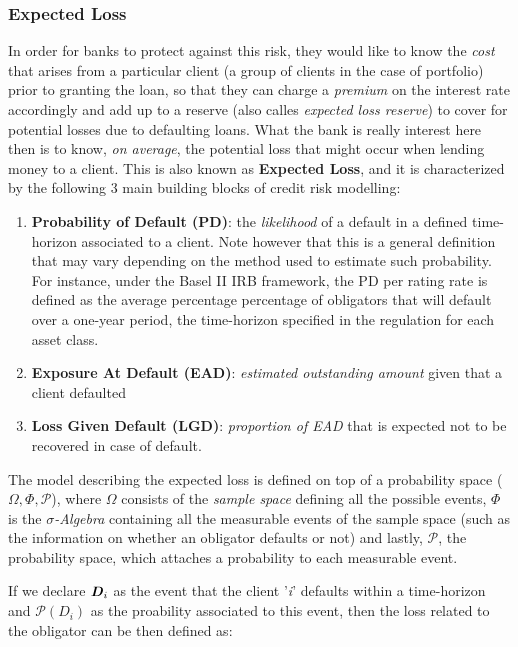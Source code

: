 \documentclass[a4paper,12pt]{article}
\begin{document}
    \subsubsection{Expected Loss}
    In order for banks to protect against this risk, they would like to know the \textit{cost} that arises from a particular client (a group of clients in the case of portfolio) 
    prior to granting the loan, so that they can charge a \textit{premium} on the interest rate accordingly and add up to a reserve (also calles \textit{expected loss reserve}) to cover for potential losses due to defaulting loans.
    What the bank is really interest here then is to know, \textit{on average}, the potential loss that might occur when lending money to a client. This is also known as \textbf{Expected Loss}, and it is characterized by the following 3 main building blocks of credit risk modelling:

        \begin{enumerate}
            \item \textbf{Probability of Default (PD)}: the \textit{likelihood} of a default in a defined time-horizon associated to a client. Note however that this is a general definition that may vary depending on the method used to estimate such probability. For instance, under the Basel II IRB framework, the PD per rating rate is defined as the average percentage percentage of obligators that will default over a one-year period, the time-horizon specified in the regulation for each asset class.
            \item \textbf{Exposure At Default (EAD)}: \textit{estimated outstanding amount} given that a client defaulted
            \item \textbf{Loss Given Default (LGD)}: \textit{proportion of EAD} that is expected not to be recovered in case of default.
        \end{enumerate}
    The model describing the expected loss is defined on top of a probability space ($\Omega,\Phi,\mathcal{P}$), where $\Omega$ consists of the \textit{sample space} defining all the possible events, 
    $\Phi$ is the \textit{$\sigma$-Algebra} containing all the measurable events of the sample space (such as the information on whether an obligator defaults or not) and lastly, 
    $\mathcal{P}$, the probability space, which attaches a probability to each measurable event.

    If we declare $\textbf{\textit{D}}_{i}$ as the event that the client '\textit{i}' defaults within a time-horizon and $\mathcal{P}(D_{i})$ as the proability associated to this event, then 
    the loss related to the obligator can be then defined as:
    
\end{document}
